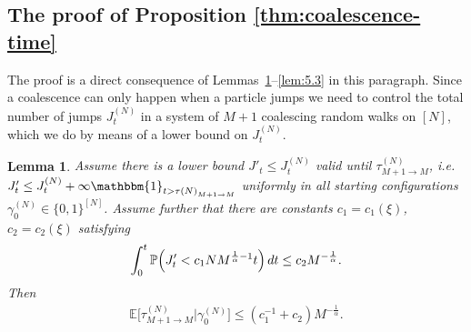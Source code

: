 \documentclass[11pt,a4paper]{scrartcl}
\numberwithin{equation}{section}
\theoremstyle{plain}
\newtheorem{lemma}[theorem]{Lemma}
\theoremstyle{definition}
\theoremstyle{remark}
\newcommand{\bE}{\ensuremath{\mathbb{E}}}
\newcommand{\bP}{\ensuremath{\mathbb{P}}}
\newcommand{\ind}{\ensuremath{\mathbbm{1}}}
\newcommand{\di}{\,\textup{d}}
\newcommand{\super}[1]{{(#1)}}
\begin{document}
\subsection*{The proof of Proposition \ref{thm:coalescence-time}}
The proof is a direct consequence of Lemmas~\ref{lem:5.1}--\ref{lem:5.3} in this paragraph. Since a coalescence can only happen when a particle jumps we need to control the total number of jumps $J^\super{N}_t$ in a system of $M+1$ coalescing random walks on $[N]$, which we do by means of a lower bound on $J_t^\super{N}$.
\begin{lemma}\label{lem:5.1}
	Assume there is a lower bound $J'_t \leq J^\super{N}_t$ valid until $\tau^\super{N}_{M+1\to M}$, i.e.\ $J'_t \leq J^\super{N}_t + \infty\ind_{t> \tau\super{N}_{M+1\to M}}$ uniformly in all starting configurations $\gamma_0^{(N)}\in\{0,1\}^{[N]}$. Assume further that there are constants $c_1=c_1(\xi)$, $c_2=c_2(\xi)$ satisfying
	\begin{align}
		\int_0^t \bP\Big(J'_t < c_1 N M^{\frac1\alpha-1} t \Big) \di t \leq c_2 M^{-\frac1\alpha}.
	\end{align}
	Then
	\begin{align}
		\bE \big[\tau^\super{N}_{M+1\to M}\big | \gamma_0^{(N)}\big] \leq (c_1^{-1}+c_2)M^{-\frac1\alpha}.
	\end{align}
\end{lemma}
\end{document}
